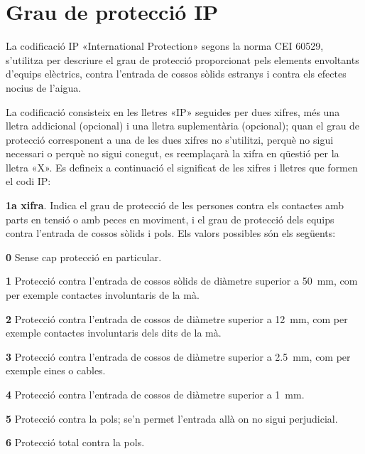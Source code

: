 \section{Grau de protecció IP}   

La codificació IP «International Protection»  segons la
norma CEI 60529, s'utilitza per descriure el grau de
protecció  proporcionat pels elements envoltants d'equips elèctrics, contra
l'entrada de cossos sòlids estranys i contra els efectes nocius
de l'aigua.

La codificació consisteix en les lletres «IP»
seguides per dues xifres, més una lletra addicional (opcional) i una
lletra suplementària (opcional); quan el grau de protecció
corresponent a una de les dues xifres no s'utilitzi, perquè no sigui
necessari o perquè no sigui conegut, es reemplaçarà la xifra en
qüestió per la lletra «X». Es defineix a continuació el
significat de les xifres i lletres que formen el codi IP:

\textbf{1a xifra}. Indica el grau de protecció de les persones contra els contactes amb
parts en tensió o amb peces en moviment, i el grau de protecció dels equips contra l'entrada de cossos sòlids i pols. Els valors possibles són els següents:
\begin{list}{}
   {\setlength{\labelwidth}{10mm} \setlength{\leftmargin}{10mm} \setlength{\labelsep}{2mm}}
   \item[\textbf{0}] Sense cap protecció en particular.
   \item[\textbf{1}] Protecció contra l'entrada de cossos sòlids de diàmetre superior a \SI{50}{mm},
   com per exemple   contactes involuntaris de la mà.
   \item[\textbf{2}] Protecció contra l'entrada de cossos de diàmetre superior a \SI{12}{mm}, com per exemple
   contactes involuntaris dels dits de la mà.
   \item[\textbf{3}] Protecció contra l'entrada de cossos de diàmetre superior a \SI{2,5}{mm},
   com per exemple eines o cables.
   \item[\textbf{4}] Protecció contra l'entrada de cossos de diàmetre superior a \SI{1}{mm}.
   \item[\textbf{5}] Protecció contra la pols; se'n permet l'entrada allà on no sigui perjudicial.
   \item[\textbf{6}] Protecció total contra la pols.
\end{list}

